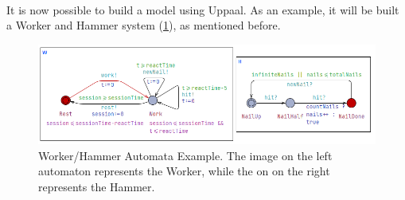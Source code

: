 


\paragraph{}

It is now possible to build a model using Uppaal. As an example, it will be built a Worker and Hammer system (\ref{fig:worker model}), as mentioned before.

\begin{figure} [H]
    \centering
    \includegraphics[width=\linewidth]{chapters/worker_hammer.png}
    \caption{Worker/Hammer Automata Example. The image on the left automaton represents the Worker, while the on on the right represents the Hammer.}
    \label{fig:worker model}
\end{figure}



